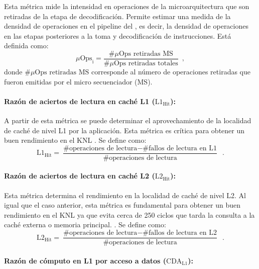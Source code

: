 Esta métrica mide la intensidad en operaciones de la microarquitectura que son retiradas de la etapa de decodificaci\'on. Permite estimar una medida de la densidad de operaciones en el pipeline del , es decir, la densidad de operaciones en las etapas posteriores a la toma y decodificaci\'on de instrucciones. Está definida como:
%
\begin{equation}
\mu\text{Ops}_{\text{i}}= \frac{\text{\#}\mu\text{Ops retiradas MS}}{\text{\#}\mu\text{Ops retiradas totales}} \enspace ,
\end{equation}
%
donde $\text{\#}\mu\text{Ops retiradas MS}$ corresponde al n\'umero de operaciones retiradas que fueron emitidas por el micro secuenciador (MS).


\paragraph*{Raz\'on de aciertos de lectura en cach\'e L1 ($\text{L1}_{\text{Hit}}$):}

A partir de esta m\'etrica se puede determinar el aprovechamiento de la localidad de cach\'e de nivel L1 por la aplicaci\'on. Esta m\'etrica es cr\'itica para obtener un buen rendimiento en el KNL \cite{Jeffers2016315}. Se define como:
%
\begin{equation}
\text{L1}_{\text{Hit}} = \frac{\text{\# operaciones de lectura}-\text{\# fallos de lectura en L1}}{\text{\# operaciones de lectura}} \enspace .
\end{equation}

\paragraph*{Raz\'on de aciertos de lectura en cach\'e L2 ($\text{L2}_{\text{Hit}}$):}

Esta m\'etrica determina el rendimiento en la localidad de cach\'e de nivel L2. Al igual que el caso anterior, esta m\'etrica es fundamental para obtener un buen rendimiento en el KNL ya que evita cerca de 250 ciclos que tarda la consulta a la cach\'e externa o memoria principal. \cite{Jeffers2016315}. Se define como:
%
\begin{equation}
\text{L2}_{\text{Hit}} = \frac{\text{\# operaciones de lectura}-\text{\# fallos de lectura en L2}}{\text{\# operaciones de lectura}} \enspace .
\end{equation}


\paragraph*{Raz\'on de c\'omputo en L1 por acceso a datos ($\text{CDA}_\text{L1}$):}

